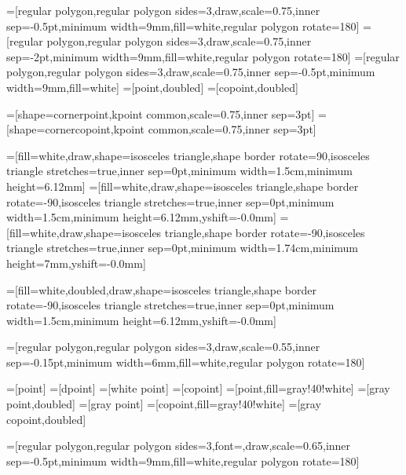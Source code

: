 =[regular polygon,regular polygon sides=3,draw,scale=0.75,inner sep=-0.5pt,minimum width=9mm,fill=white,regular polygon rotate=180]
=[regular polygon,regular polygon sides=3,draw,scale=0.75,inner sep=-2pt,minimum width=9mm,fill=white,regular polygon rotate=180]
=[regular polygon,regular polygon sides=3,draw,scale=0.75,inner sep=-0.5pt,minimum width=9mm,fill=white]
=[point,doubled]
=[copoint,doubled]

=[shape=cornerpoint,kpoint common,scale=0.75,inner sep=3pt]
=[shape=cornercopoint,kpoint common,scale=0.75,inner sep=3pt]

=[fill=white,draw,shape=isosceles triangle,shape border rotate=90,isosceles triangle stretches=true,inner sep=0pt,minimum width=1.5cm,minimum height=6.12mm]
=[fill=white,draw,shape=isosceles triangle,shape border rotate=-90,isosceles triangle stretches=true,inner sep=0pt,minimum width=1.5cm,minimum height=6.12mm,yshift=-0.0mm]
=[fill=white,draw,shape=isosceles triangle,shape border rotate=-90,isosceles triangle stretches=true,inner sep=0pt,minimum width=1.74cm,minimum height=7mm,yshift=-0.0mm]

=[fill=white,doubled,draw,shape=isosceles triangle,shape border rotate=-90,isosceles triangle stretches=true,inner sep=0pt,minimum width=1.5cm,minimum height=6.12mm,yshift=-0.0mm]

=[regular polygon,regular polygon sides=3,draw,scale=0.55,inner sep=-0.15pt,minimum width=6mm,fill=white,regular polygon rotate=180]

=[point]
=[dpoint]
=[white point] %
=[copoint]
=[point,fill=gray!40!white]
=[gray point,doubled]
=[gray point] %
=[copoint,fill=gray!40!white]
=[gray copoint,doubled]

=[regular polygon,regular polygon sides=3,font=\scriptsize,draw,scale=0.65,inner sep=-0.5pt,minimum width=9mm,fill=white,regular polygon rotate=180]

